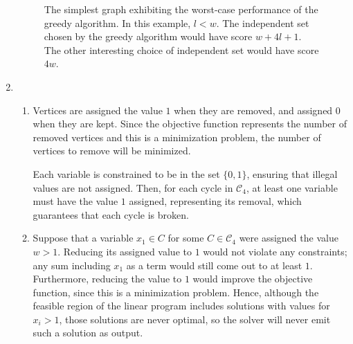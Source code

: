 \documentclass[letterpaper,11pt]{article}
\begin{document}
\begin{enumerate}
\begin{figure}[ht]

            \caption{
                The simplest graph exhibiting the worst-case performance of the
                greedy algorithm. In this example, $l < w$. The independent set
                chosen by the greedy algorithm would have score $w + 4l + 1$.
                The other interesting choice of independent set would have
                score $4w$.
            }
            \label{fig:independent-set}
        \end{figure}

    \item
        \begin{enumerate}
            \item
                Vertices are assigned the value $1$ when they are removed, and
                assigned $0$ when they are kept. Since the objective function
                represents the number of removed vertices and this is a
                minimization problem, the number of vertices to remove will be
                minimized.

                Each variable is constrained to be in the set $\{0, 1\}$,
                ensuring that illegal values are not assigned. Then, for each
                cycle in $\mathcal{C}_4$, at least one variable must have the
                value $1$ assigned, representing its removal, which guarantees
                that each cycle is broken.

            \item
                Suppose that a variable $x_1 \in C$ for some
                $C \in \mathcal{C}_4$ were assigned the value $w > 1$. Reducing
                its assigned value to $1$ would not violate any constraints;
                any sum including $x_1$ as a term would still come out to at
                least $1$. Furthermore, reducing the value to $1$ would improve
                the objective function, since this is a minimization problem.
                Hence, although the feasible region of the linear program
                includes solutions with values for $x_i > 1$, those solutions
                are never optimal, so the solver will never emit such a
                solution as output.


\end{enumerate}
\end{enumerate}
\end{document}
